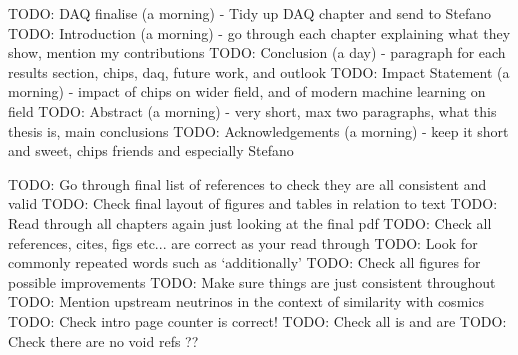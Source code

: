 TODO: DAQ finalise (a morning) - Tidy up DAQ chapter and send to Stefano 
TODO: Introduction (a morning) - go through each chapter explaining what they show, mention my contributions
TODO: Conclusion (a day) - paragraph for each results section, chips, daq, future work, and outlook
TODO: Impact Statement (a morning) - impact of chips on wider field, and of modern machine learning on field
TODO: Abstract (a morning) - very short, max two paragraphs, what this thesis is, main conclusions
TODO: Acknowledgements (a morning) - keep it short and sweet, chips friends and especially Stefano

TODO: Go through final list of references to check they are all consistent and valid
TODO: Check final layout of figures and tables in relation to text
TODO: Read through all chapters again just looking at the final pdf
TODO: Check all references, cites, figs etc... are correct as your read through
TODO: Look for commonly repeated words such as `additionally'
TODO: Check all figures for possible improvements
TODO: Make sure things are just consistent throughout
TODO: Mention upstream neutrinos in the context of similarity with cosmics
TODO: Check intro page counter is correct!
TODO: Check all is and are
TODO: Check there are no void refs ??